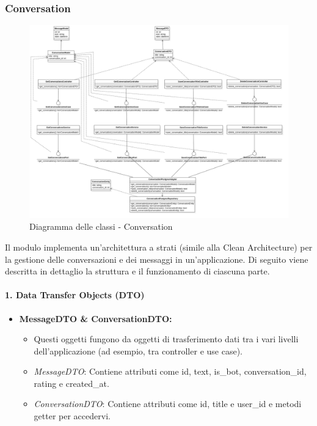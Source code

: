     \subsubsection{Conversation}

    \begin{figure}[H]
        \centering
        \includegraphics[width=\linewidth, height=0.8\textheight, keepaspectratio]{./img/png/Model3!Conversation_3.png}
        \caption{Diagramma delle classi - Conversation}
        \label{fig:conversation}
    \end{figure}

    Il modulo implementa un'architettura a strati (simile alla Clean Architecture) per la gestione delle conversazioni e dei messaggi in un'applicazione. Di seguito viene descritta in dettaglio la struttura e il funzionamento di ciascuna parte.

    \paragraph{1. Data Transfer Objects (DTO)}
    \begin{itemize}
        \item \textbf{MessageDTO \& ConversationDTO:}
        \begin{itemize}
            \item Questi oggetti fungono da oggetti di trasferimento dati tra i vari livelli dell'applicazione (ad esempio, tra controller e use case).
            \item \textit{MessageDTO}: Contiene attributi come id, text, is\_bot, conversation\_id, rating e created\_at.
            \item \textit{ConversationDTO}: Contiene attributi come id, title e user\_id e metodi getter per accedervi.
        \end{itemize}
    \end{itemize}

